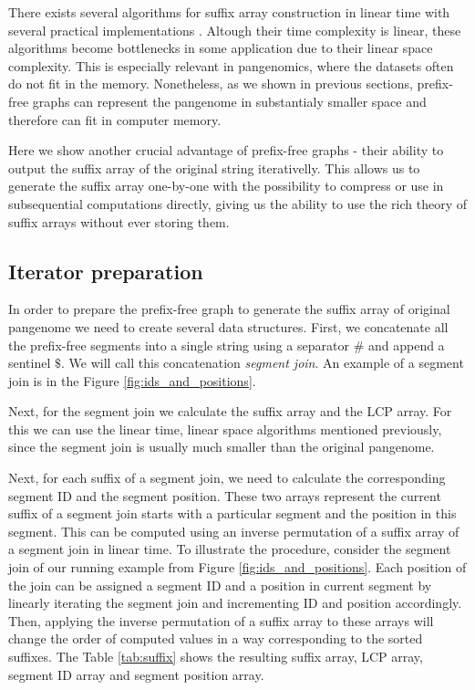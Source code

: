 \documentclass[twocolumn]{ceurart}
\begin{document}
There exists several algorithms for suffix array construction in linear time
\cite{} with several practical implementations \cite{}.
Altough their time complexity is linear, these algorithms become bottlenecks in
some application due to their linear space complexity.
This is especially relevant in pangenomics, where the datasets often do not fit
in the memory.
Nonetheless, as we shown in previous sections, prefix-free graphs can represent
the pangenome in substantialy smaller space and therefore can fit in computer
memory.

Here we show another crucial advantage of prefix-free graphs - their ability to
output the suffix array of the original string iterativelly.
This allows us to generate the suffix array one-by-one with the possibility
to compress or use in subsequential computations directly, giving us the ability
to use the rich theory of suffix arrays without ever storing them.

\subsection{Iterator preparation}
In order to prepare the prefix-free graph to generate the suffix array of
original pangenome we need to create several data structures.
First, we concatenate all the prefix-free segments into a single string using
a separator $\#$ and append a sentinel $\$$.
We will call this concatenation \emph{segment join}.
An example of a segment join is in the Figure \ref{fig:ids_and_positions}.

Next, for the segment join we calculate the suffix array and the LCP array.
For this we can use the linear time, linear space algorithms mentioned previously,
since the segment join is usually much smaller than the original pangenome.

Next, for each suffix of a segment join, we need to calculate the corresponding
segment ID and the segment position.
These two arrays represent the current suffix of a segment join starts with a
particular segment and the position in this segment.
This can be computed using an inverse permutation of a suffix array of a segment
join in linear time.
To illustrate the procedure, consider the segment join of our running example from
Figure \ref{fig:ids_and_positions}.
Each position of the join can be assigned a segment ID and a position in current
segment by linearly iterating the segment join and incrementing ID and position
accordingly.
Then, applying the inverse permutation of a suffix array to these arrays will
change the order of computed values in a way corresponding to the sorted suffixes.
The Table \ref{tab:suffix} shows the resulting suffix array, LCP array,
segment ID array and segment position array.
\end{document}
